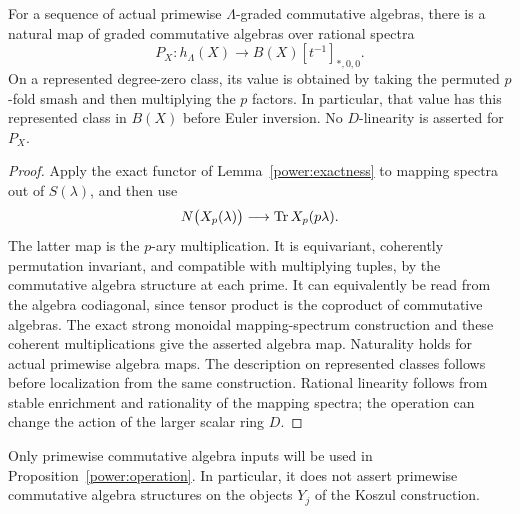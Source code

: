 \begin{proposition}
\label{power:operation}
For a sequence of actual primewise $\Lambda$-graded commutative
algebras, there is a natural map of graded commutative algebras over
rational spectra
\begin{equation}
 \label{power:raw-operation}
 P_X:h_\Lambda(X)\longrightarrow B(X)[t^{-1}]_{*,0,0}.
\end{equation}
On a represented degree-zero class, its value is obtained by taking
the permuted $p$-fold smash and then multiplying the $p$ factors. In
particular, that value has this represented class in $B(X)$ before
Euler inversion. No $D$-linearity is asserted for $P_X$.
\end{proposition}

\begin{proof}
Apply the exact functor of Lemma~\ref{power:exactness} to mapping
spectra out of $S(\lambda)$, and then use
\[
 N\bigl(X_p(\lambda)\bigr)\longrightarrow
 \operatorname{Tr} X_p(p\lambda).
\]
The latter map is the $p$-ary multiplication. It is equivariant,
coherently permutation invariant, and compatible with multiplying
tuples, by the commutative algebra structure at each prime. It can
equivalently be read from the algebra codiagonal, since tensor product
is the coproduct of commutative algebras. The exact strong monoidal
mapping-spectrum construction and these coherent multiplications
give the asserted algebra map. Naturality holds for actual primewise
algebra maps. The description on represented classes follows before
localization from the same construction. Rational linearity follows
from stable enrichment and rationality of the mapping spectra; the
operation can change the action of the larger scalar ring $D$.
\end{proof}

Only primewise commutative algebra inputs will be used in
Proposition~\ref{power:operation}. In particular, it does not assert
primewise commutative algebra structures on the objects $Y_j$ of the
Koszul construction.
